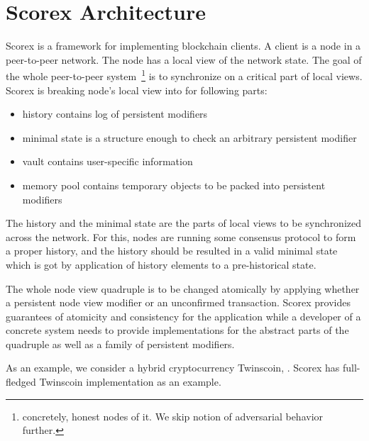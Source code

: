 
\section{Scorex Architecture}

Scorex is a framework for implementing blockchain clients. A client is a node in a peer-to-peer network. The node has a local view of the network state. The goal of the whole peer-to-peer system~\footnote{concretely, honest nodes of it. We skip notion of adversarial behavior further.} is to synchronize on a critical part of local views. Scorex is breaking node's local view into for following parts: 

\begin{itemize}
\item{history} contains log of persistent modifiers
\item{minimal state} is a structure enough to check an arbitrary persistent modifier
\item{vault} contains user-specific information
\item{memory pool} contains temporary objects to be packed into persistent modifiers 
\end{itemize}

The history and the minimal state are the parts of local views to be synchronized across the network. For this, nodes are running some consensus protocol to form a proper history, and the history should be resulted in a valid minimal state which is got by application of history elements to a pre-historical state.

The whole node view quadruple is to be changed atomically by applying whether a persistent node view modifier or an unconfirmed transaction. Scorex provides guarantees of atomicity and consistency for the application while a developer of a concrete system needs to provide implementations for the abstract parts of the quadruple as well as a family of persistent modifiers.

As an example, we consider a hybrid cryptocurrency Twinscoin, . Scorex has full-fledged Twinscoin implementation as an example. 
